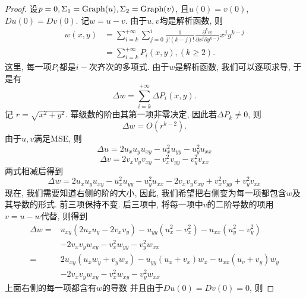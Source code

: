 \begin{proof}
    设$p=0, \Sigma_1=\text{Graph}(u), \Sigma_2=\text{Graph}(v)$, 且$u(0)=v(0)$, $Du(0)=Dv(0)$. 记$w=u-v$. 由于$u,v$均是解析函数, 则
    \begin{equation}
        \begin{split}
            w(x,y)&=\sum_{i=k}^{+\infty} \sum_{j=0}^{i} \frac{1}{j!(k-j)!}\frac{\partial^k w}{\partial x^j \partial y^{k-j}}x^jy^{k-j} \\
            &=\sum_{i=k}^{+\infty} P_i(x,y), (k\ge 2).
        \end{split}
    \end{equation}
    这里, 每一项$P_i$都是$i-$次齐次的多项式.  由于$w$是解析函数, 我们可以逐项求导, 于是有
    \begin{equation}
        \Delta w= \sum_{i=k}^{+\infty} \Delta P_i(x,y).
    \end{equation}
    记 $r=\sqrt{x^2+y^2}$. 幂级数的阶由其第一项非零决定, 因此若$\Delta P_k \ne 0$, 则
    \begin{equation} \label{equiangular1}
        \Delta w=O(r^{k-2}).
    \end{equation}
    由于$u,v$满足MSE, 则
    \begin{equation}
        \Delta u= 2u_xu_yu_{xy}-u_x^2u_{yy}-u_y^2u_{xx} 
    \end{equation}
    \begin{equation}
        \Delta v= 2v_xv_yv_{xy}-v_x^2v_{yy}-v_y^2v_{xx} 
    \end{equation}
    两式相减后得到
    \begin{equation}
        \Delta w= 2u_xu_yu_{xy}-u_x^2u_{yy}-u_y^2u_{xx} -2v_xv_yv_{xy}+v_x^2v_{yy}+v_y^2v_{xx} 
    \end{equation}
    现在, 我们需要知道右侧的阶的大小, 因此, 我们希望把右侧变为每一项都包含$w$及其导数的形式. 前三项保持不变. 后三项中, 将每一项中$v$的二阶导数的项用 $v=u-w$代替, 则得到
    \begin{equation}
        \begin{split}
            \Delta w =& u_{xy}(2u_xu_y-2v_xv_y)-u_{yy}(u_x^2-v_x^2)-u_{xx}(u_y^2-v_y^2) \\
                &-2v_xv_yw_{xy}-v_x^2w_{yy}-v_y^2w_{xx} \\
                =&2u_{xy}(u_xw_y+v_yw_x)-u_{yy}(u_x+v_x)w_x-u_{xx}(u_v+v_y)w_y\\
                &-2v_xv_yw_{xy}-v_x^2w_{xy}-v_y^2w_{xx}
        \end{split}
    \end{equation}
    上面右侧的每一项都含有$w$的导数 并且由于$Du(0)=Dv(0)=0$, 则

\end{proof}
